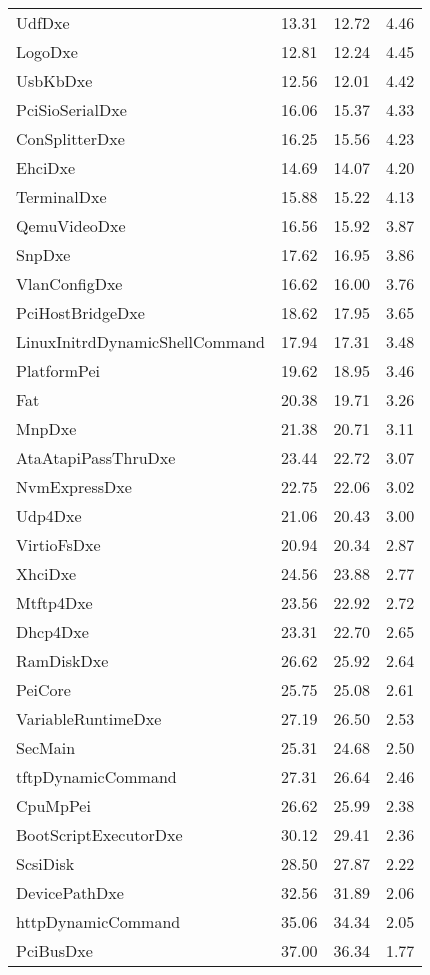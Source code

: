 \begin{longtable}{l c c c}
  UdfDxe & 13.31 & 12.72 & 4.46\\
  LogoDxe & 12.81 & 12.24 & 4.45\\
  UsbKbDxe & 12.56 & 12.01 & 4.42\\
  PciSioSerialDxe & 16.06 & 15.37 & 4.33\\
  ConSplitterDxe & 16.25 & 15.56 & 4.23\\
  EhciDxe & 14.69 & 14.07 & 4.20\\
  TerminalDxe & 15.88 & 15.22 & 4.13\\
  QemuVideoDxe & 16.56 & 15.92 & 3.87\\
  SnpDxe & 17.62 & 16.95 & 3.86\\
  VlanConfigDxe & 16.62 & 16.00 & 3.76\\
  PciHostBridgeDxe & 18.62 & 17.95 & 3.65\\
  LinuxInitrdDynamicShellCommand & 17.94 & 17.31 & 3.48\\
  PlatformPei & 19.62 & 18.95 & 3.46\\
  Fat & 20.38 & 19.71 & 3.26\\
  MnpDxe & 21.38 & 20.71 & 3.11\\
  AtaAtapiPassThruDxe & 23.44 & 22.72 & 3.07\\
  NvmExpressDxe & 22.75 & 22.06 & 3.02\\
  Udp4Dxe & 21.06 & 20.43 & 3.00\\
  VirtioFsDxe & 20.94 & 20.34 & 2.87\\
  XhciDxe & 24.56 & 23.88 & 2.77\\
  Mtftp4Dxe & 23.56 & 22.92 & 2.72\\
  Dhcp4Dxe & 23.31 & 22.70 & 2.65\\
  RamDiskDxe & 26.62 & 25.92 & 2.64\\
  PeiCore & 25.75 & 25.08 & 2.61\\
  VariableRuntimeDxe & 27.19 & 26.50 & 2.53\\
  SecMain & 25.31 & 24.68 & 2.50\\
  tftpDynamicCommand & 27.31 & 26.64 & 2.46\\
  CpuMpPei & 26.62 & 25.99 & 2.38\\
  BootScriptExecutorDxe & 30.12 & 29.41 & 2.36\\
  ScsiDisk & 28.50 & 27.87 & 2.22\\
  DevicePathDxe & 32.56 & 31.89 & 2.06\\
  httpDynamicCommand & 35.06 & 34.34 & 2.05\\
  PciBusDxe & 37.00 & 36.34 & 1.77\\

\end{longtable}
